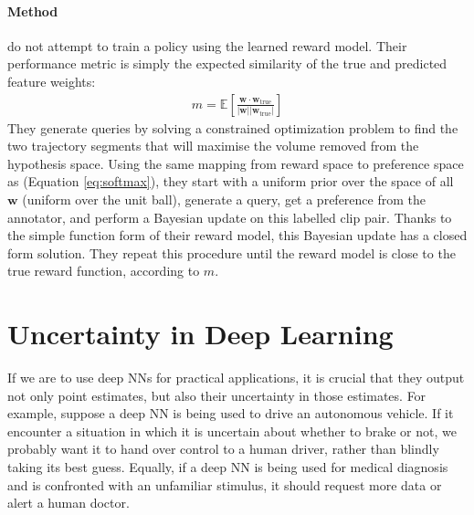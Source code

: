 \documentclass[11pt, a4paper, bibliography=totoc]{report}
\newcommand{\w}{\mathbf{w}}
\begin{document}
\subsubsection{Method}
\cite{Byk2017} do not attempt to train a policy using the learned reward model. Their performance metric is simply the expected similarity of the true and predicted feature weights:
\begin{align*}
m = \mathbb{E}\left[  \frac{\w \cdot \w_\text{true}}{\vert \w \vert \vert \w_\text{true} \vert}  \right]
\end{align*}
They generate queries by solving a constrained optimization problem to find the two trajectory segments that will maximise the volume removed from the hypothesis space. Using the same mapping from reward space to preference space as \cite{Christiano2017} (Equation \ref{eq:softmax}), they start with a uniform prior over the space of all $ \w $ (uniform over the unit ball), generate a query, get a preference from the annotator, and perform a Bayesian update on this labelled clip pair. Thanks to the simple function form of their reward model, this Bayesian update has a closed form solution. They repeat this procedure until the reward model is close to the true reward function, according to $ m $.

\chapter{Uncertainty in Deep Learning}
If we are to use deep NNs for practical applications, it is crucial that they output not only point estimates, but also their uncertainty in those estimates. For example, suppose a deep NN is being used to drive an autonomous vehicle. If it encounter a situation in which it is uncertain about whether to brake or not, we probably want it to hand over control to a human driver, rather than blindly taking its best guess. Equally, if a deep NN is being used for medical diagnosis and is confronted with an unfamiliar stimulus, it should request more data or alert a human doctor.
\end{document}
